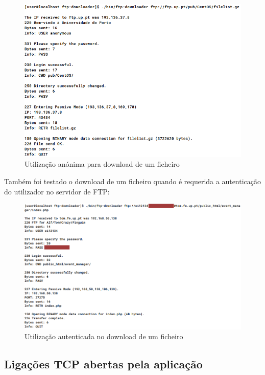 \documentclass[a4paper,11pt,titlepage]{article}
\begin{document}
\begin{figure}[H]
    \center
    \includegraphics[scale=0.45]{res/anonymous.png}
    \caption{Utilização anónima para download de um ficheiro}
    \label{fig:anonymous.png}
\end{figure}

Também foi testado o download de um ficheiro quando é requerida a autenticação
do utilizador no servidor de FTP:

\begin{figure}[H]
    \center
    \includegraphics[scale=0.45]{res/authenticated.png}
    \caption{Utilização autenticada no download de um ficheiro}
    \label{fig:authenticated.png}
\end{figure}

\subsection*{Ligações TCP abertas pela aplicação}
\end{document}
